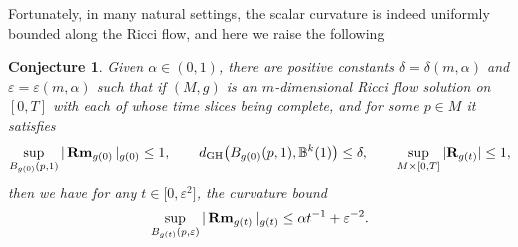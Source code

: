\documentclass[10pt,a4paper]{amsart}
\numberwithin{equation}{section}
\newtheorem{Conjecture}[Theorem]{Conjecture}
\newcommand{\Rm}{\operatorname{\bf Rm}}
\newcommand{\Sc}{\mathbf{R}}
\begin{document}
Fortunately, in many natural settings, the scalar curvature is indeed uniformly
bounded along the Ricci flow, and here we raise the following
\begin{Conjecture}
Given $\alpha\in (0,1)$, there are positive constants
$\delta=\delta(m,\alpha)$ and $\varepsilon=\varepsilon(m,\alpha)$ such that
if $(M,g)$ is an $m$-dimensional Ricci flow solution on $[0,T]$ with each of whose
time slices being complete, and for some $p\in M$ it satisfies
\begin{align*}
\sup_{B_{g(0)}(p,1)} |\Rm_{g(0)} |_{g(0)} \le 1,\qquad
d_{\rm GH}\big(B_{g(0)}(p,1),\mathbb{B}^k(1)\big) \le
\delta,\qquad \sup_{M\times [0,T]} |\Sc_{g(t)} | \le 1,
\end{align*}
then we have for any $t\in \big[0,\varepsilon^2\big]$, the curvature bound
\begin{align*}
\sup_{B_{g(t)}(p,\varepsilon)} |\Rm_{g(t)} |_{g(t)} \le \alpha
t^{-1} + \varepsilon^{-2}.
\end{align*}
\end{Conjecture}
\end{document}

